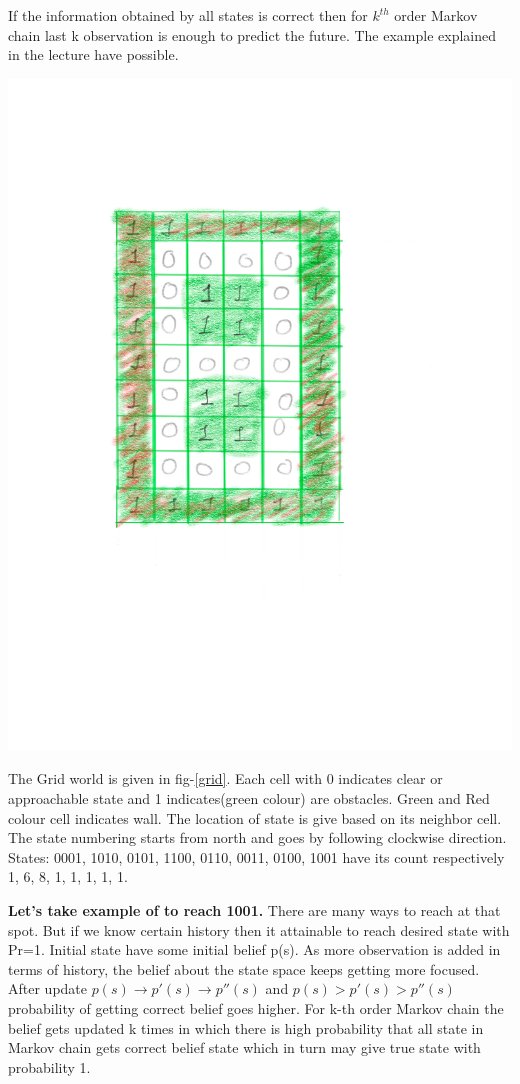 \documentclass[solution,addpoints,12pt]{exam}
\begin{document}
\begin{questions}
\begin{solution}
If the information obtained by all states is correct then for $k^{th}$ order Markov chain last k observation is enough to predict the future.  
The example explained in the lecture have possible. 
\begin{center}
	\includegraphics[trim={10cm 20cm 19cm 14cm},clip,scale=0.2]{belief.png}\label{grid}
\end{center}

The Grid world is given in fig-\ref{grid}. Each cell with 0 indicates clear or approachable state and 1 indicates(green colour) are obstacles. Green and Red colour cell indicates wall. The location of state is give based on its neighbor cell. The state numbering starts from north and goes by following clockwise direction. States: 0001, 1010, 0101, 1100, 0110, 0011, 0100, 1001 have its count respectively 1, 6, 8, 1, 1, 1, 1, 1.

\textbf{Let's take example of to reach 1001.}  There are many ways to reach at that spot. But if we know certain history then it attainable to reach desired state with Pr=1. Initial state have some initial belief p(s). As more observation is added in terms of history, the belief about the state space keeps getting more focused. After update $p(s)\rightarrow p'(s) \rightarrow p''(s)$ and $p(s)> p'(s)> p''(s)$ probability of getting correct belief goes higher. For k-th order Markov chain the belief gets updated k times in which there is high probability that all state in Markov chain gets correct belief state which in turn may give true state with probability 1.


\end{solution}
\end{questions}
\end{document}
